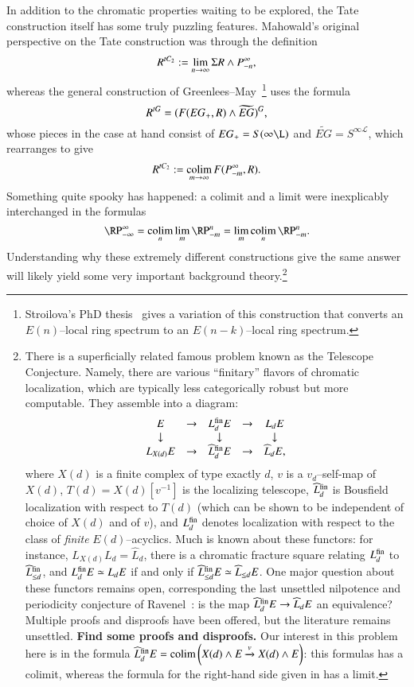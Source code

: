 In addition to the chromatic properties waiting to be explored, the Tate construction itself has some truly puzzling features.  Mahowald's original perspective on the Tate construction was through the definition \[R^{tC_2} := \lim_{n \to \infty} \Sigma R \wedge P^\infty_{-n},\] whereas the general construction of Greenlees--May~\cite{GreenleesMay}\footnote{Stroilova's PhD thesis~\cite{Stroilova} gives a variation of this construction that converts an $E(n)$--local ring spectrum to an $E(n-k)$--local ring spectrum.} uses the formula \[R^{tG} = (F(EG_+, R) \wedge \widetilde{EG})^G,\] whose pieces in the case at hand consist of $EG_+ = S(\infty \L)$ and $\widetilde{EG} = S^{\infty \mathcal L}$, which rearranges to give \[R^{tC_2} := \operatorname*{colim}_{m \to \infty} F(P^\infty_{-m}, R).\]  Something quite spooky has happened: a colimit and a limit were inexplicably interchanged in the formulas \[\RP^\infty_{-\infty} = \colim_n \lim_m \RP^n_{-m} = \lim_m \colim_n \RP^n_{-m}.\]  Understanding why these extremely different constructions give the same answer will likely yield some very important background theory.\footnote{There is a superficially related famous problem known as the Telescope Conjecture.  Namely, there are various ``finitary'' flavors of chromatic localization, which are typically less categorically robust but more computable.  They assemble into a diagram:
\[\begin{array}{ccccc}
E & \to & L_d^{\mathrm{fin}} E & \to & L_d E \\
\downarrow & & \downarrow & & \downarrow \\
L_{X(d)} E & \to & \widehat L_d^{\mathrm{fin}} E & \to & \widehat L_d E,
\end{array}\]
where $X(d)$ is a finite complex of type exactly $d$, $v$ is a $v_d$--self-map of $X(d)$, $T(d) = X(d)[v^{-1}]$ is the localizing telescope, $\widehat L_d^{\mathrm{fin}}$ is Bousfield localization with respect to $T(d)$ (which can be shown to be independent of choice of $X(d)$ and of $v$), and $L_d^{\mathrm{fin}}$ denotes localization with respect to the class of \emph{finite} $E(d)$--acyclics.  Much is known about these functors: for instance, $L_{X(d)} L_d = \widehat L_d$, there is a chromatic fracture square relating $L_d^{\mathrm{fin}}$ to $\widehat L_{\le d}^{\mathrm{fin}}$, and $L_d^{\mathrm{fin}} E \simeq L_d E$ if and only if $\widehat L_{\le d}^{\mathrm{fin}} E \simeq \widehat L_{\le d} E$.  One major question about these functors remains open, corresponding the last unsettled nilpotence and periodicity conjecture of Ravenel~\cite[Conjecture 10.5]{RavenelLocalizationWRTPeriodic}: is the map $\widehat L_d^{\mathrm{fin}} E \to \widehat L_d E$ an equivalence?  Multiple proofs and disproofs have been offered, but the literature remains unsettled. \textbf{Find some proofs and disproofs.}  Our interest in this problem here is in the formula $\widehat L_d^{\mathrm{fin}} E = \operatorname*{colim}\left(X(d) \wedge E \xrightarrow{v} X(d) \wedge E\right)$: this formulas has a colimit, whereas the formula for the right-hand side given in  has a limit.}

